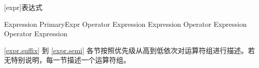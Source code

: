 
[expr]{表达式}

\begin{bnf}{Expression}
    PrimaryExpr \br
    Operator Expression \br
    Expression Operator \br
    Expression Operator Expression
\end{bnf}


\pnum
\ref{expr.suffix} 到 \ref{expr.semi} 各节按照优先级从高到低依次对运算符组进行描述。若无特别说明，每一节描述一个运算符组。


